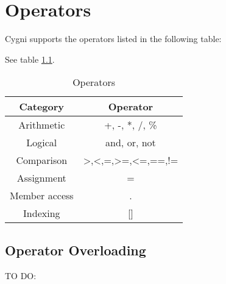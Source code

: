 \chapter{Operators}
Cygni supports the operators listed in the following table:

See table \ref{operators}.
\begin{table}
	\centering
	\begin{tabular}{|c|c|}
		\hline
		Category & Operator \\ 
		\hline
		Arithmetic & +, -, *, /, \% \\
		\hline
		Logical & and, or, not \\
		\hline
		Comparison & >,<,=,>=,<=,==,!= \\
		\hline
		Assignment & = \\
		\hline
		Member access & . \\
		\hline 
		Indexing & [] \\
		\hline
		\end{tabular}
\label{operators}
\caption{Operators}
\end{table}
\section{Operator Overloading}
TO DO:
